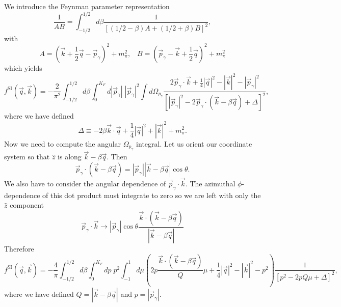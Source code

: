 \documentclass{book}[12pt]
\begin{document}
We introduce the Feynman parameter representation
\begin{equation}
\frac{1}{AB}=\int_{-1/2}^{1/2}d\beta \frac{1}{\left[(1/2-\beta)A+(1/2+\beta)B\right]^2},
\end{equation}
with 
\begin{equation}
A=\left(\vec{k}+\frac{1}{2}\vec{q}-\vec{p}_{\gamma}\right)^2+m_{\pi}^2,\;\;\;B=\left(\vec{p}_{\gamma}-\vec{k}+\frac{1}{2}\vec{q}\right)^2+m_{\pi}^2
\end{equation}
which yields
\begin{equation}
f^\mathrm{SI}(\vec{q},\vec{k})=-\frac{2}{\pi^2}\int_{-1/2}^{1/2}d\beta \int_0^{K_F}d|\vec{p}_{\gamma}|\;|\vec{p}_{\gamma}|^2\int d\Omega_{p_{\gamma}}\frac{2\vec{p}_{\gamma}\cdot\vec{k}+\frac{1}{4}|\vec{q}|^2-|\vec{k}|^2-|\vec{p}_{\gamma}|^2}{\left[|\vec{p}_{\gamma}|^2-2\vec{p}_{\gamma}\cdot\left(\vec{k}-\beta\vec{q}\right)+\Delta\right]^2},
\end{equation}
where we have defined
\begin{equation}
\Delta\equiv -2\beta\vec{k}\cdot\vec{q}+\frac{1}{4}|\vec{q}|^2+|\vec{k}|^2+m_{\pi}^2.
\end{equation}
Now we need to compute the angular $\Omega_{p_{\gamma}}$ integral. Let us orient our coordinate system so that $\hat{z}$ is along $\vec{k}-\beta\vec{q}$. Then
\begin{equation}
\vec{p}_{\gamma}\cdot \left(\vec{k}-\beta\vec{q}\right)=|\vec{p}_{\gamma}||\vec{k}-\beta\vec{q}|\cos\theta.
\end{equation}
We also have to consider the angular dependence of $\vec{p}_{\gamma}\cdot\vec{k}$. The azimuthal $\phi$-dependence of this dot product must integrate to zero so we are left with only the $\hat{z}$ component
\begin{equation}
\vec{p}_{\gamma}\cdot \vec{k}\rightarrow |\vec{p}_{\gamma}|\cos\theta \frac{\vec{k}\cdot(\vec{k}-\beta\vec{q})}{|\vec{k}-\beta\vec{q}|}
\end{equation}
Therefore
\begin{equation}
f^\mathrm{SI}(\vec{q},\vec{k})=-\frac{4}{\pi}\int_{-1/2}^{1/2}d\beta \int_0^{K_F}dp\;p^2 \int_{-1}^1d\mu \left(2p\frac{\vec{k}\cdot\left(\vec{k}-\beta\vec{q}\right)}{Q}\mu+\frac{1}{4}|\vec{q}|^2-|\vec{k}|^2-p^2\right)\frac{1}{\left[p^2-2pQ\mu+\Delta\right]^2},
\end{equation}
where we have defined $Q=|\vec{k}-\beta\vec{q}|$ and $p=|\vec{p}_\gamma|$.
\end{document}
